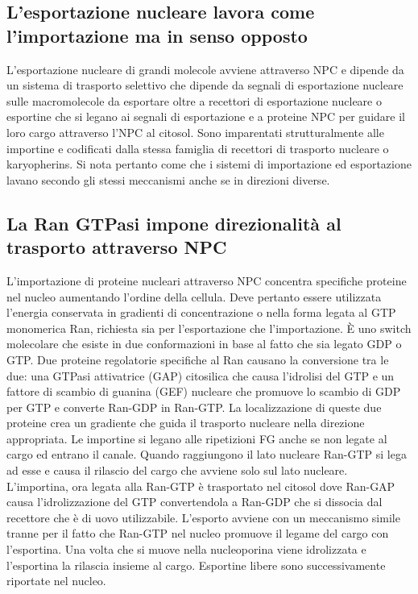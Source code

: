 \subsection{L'esportazione nucleare lavora come l'importazione ma in senso opposto}
L'esportazione nucleare di grandi molecole avviene attraverso NPC e dipende da un sistema di trasporto selettivo che dipende da segnali di esportazione nucleare sulle macromolecole da
esportare oltre a recettori di esportazione nucleare o esportine che si legano ai segnali di esportazione e a proteine NPC per guidare il loro cargo attraverso l'NPC al citosol.
Sono imparentati strutturalmente alle importine e codificati dalla stessa famiglia di recettori di trasporto nucleare o karyopherins. Si nota pertanto come che i sistemi di importazione
ed esportazione lavano secondo gli stessi meccanismi anche se in direzioni diverse.
\subsection{La Ran GTPasi impone direzionalit\`a al trasporto attraverso NPC}
L'importazione di proteine nucleari attraverso NPC concentra specifiche proteine nel nucleo aumentando l'ordine della cellula. Deve pertanto essere utilizzata l'energia conservata in
gradienti di concentrazione o nella forma legata al GTP monomerica Ran, richiesta sia per l'esportazione che l'importazione. \`E uno switch molecolare che esiste in due conformazioni
in base al fatto che sia legato GDP o GTP. Due proteine regolatorie specifiche al Ran causano la conversione tra le due: una GTPasi attivatrice (GAP) citosilica che causa l'idrolisi 
del GTP e un fattore di scambio di guanina (GEF) nucleare che promuove lo scambio di GDP per GTP e converte Ran-GDP in Ran-GTP. La localizzazione di queste due proteine crea un gradiente
che guida il trasporto nucleare nella direzione appropriata. Le importine si legano alle ripetizioni FG anche se non legate al cargo ed entrano il canale. Quando raggiungono il lato 
nucleare Ran-GTP si lega ad esse e causa il rilascio del cargo che avviene solo sul lato nucleare. L'importina, ora legata alla Ran-GTP \`e trasportato nel citosol dove Ran-GAP causa
l'idrolizzazione del GTP convertendola a Ran-GDP che si dissocia dal recettore che \`e di uovo utilizzabile. L'esporto avviene con un meccanismo simile tranne per il fatto che Ran-GTP
nel nucleo promuove il legame del cargo con l'esportina. Una volta che si muove nella nucleoporina viene idrolizzata e l'esportina la rilascia insieme al cargo. Esportine libere sono
successivamente riportate nel nucleo.

